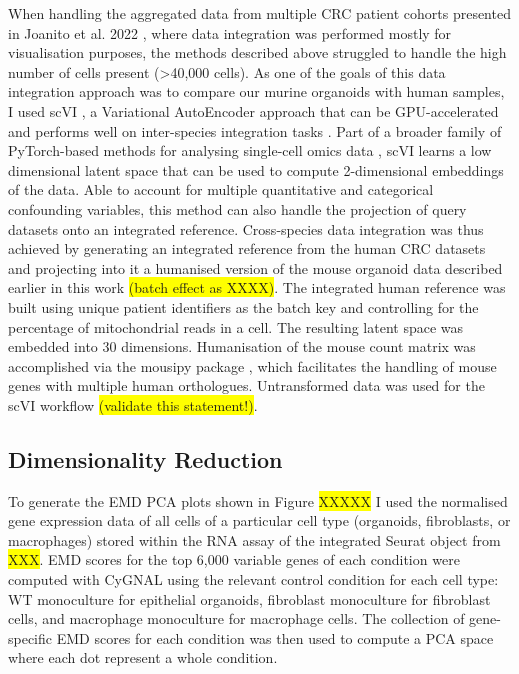 When handling the aggregated data from multiple CRC patient cohorts presented in Joanito et al. 2022 \cite{joanito_single-cell_2022}, where data integration was performed mostly for visualisation purposes, the methods described above struggled to handle the high number of cells present (>40,000 cells). As one of the goals of this data integration approach was to compare our murine organoids with human samples, I used scVI \cite{lopez_deep_2018}, a Variational AutoEncoder approach that can be GPU-accelerated and performs well on inter-species integration tasks \cite{song_benchmarking_2023}. Part of a broader family of PyTorch-based methods for analysing single-cell omics data \cite{gayoso_python_2022}, scVI learns a low dimensional latent space that can be used to compute 2-dimensional embeddings of the data. Able to account for multiple quantitative and categorical confounding variables, this method can also handle the projection of query datasets onto an integrated reference.
Cross-species data integration was thus achieved by generating an integrated reference from the human CRC datasets and projecting into it a humanised version of the mouse organoid data described earlier in this work \colorbox{yellow}{(batch effect as XXXX)}. The integrated human reference was built using unique patient identifiers as the batch key and controlling for the percentage of mitochondrial reads in a cell. The resulting latent space was embedded into 30 dimensions. Humanisation of the mouse count matrix was accomplished via the mousipy package \cite{peidli_mousipy_2023}, which facilitates the handling of mouse genes with multiple human orthologues.
Untransformed data was used for the scVI workflow \colorbox{yellow}{(validate this statement!)}. 

\subsection*{Dimensionality Reduction}

To generate the EMD PCA plots shown in Figure \colorbox{yellow}{XXXXX} I used the normalised gene expression data of all cells of a particular cell type (organoids, fibroblasts, or macrophages) stored within the RNA assay of the integrated Seurat object from \colorbox{yellow}{XXX}. EMD scores for the top 6,000 variable genes of each condition were computed with CyGNAL \cite{cardoso_tape-labcygnal_2021} using the relevant control condition for each cell type: WT monoculture for epithelial organoids, fibroblast monoculture for fibroblast cells, and macrophage monoculture for macrophage cells. The collection of gene-specific EMD scores for each condition was then used to compute a PCA space where each dot represent a whole condition.

